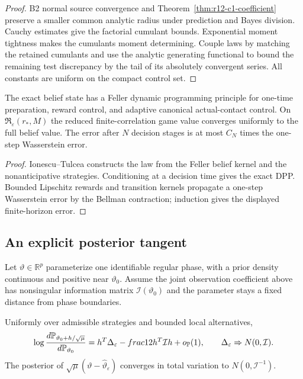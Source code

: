 \begin{proof}
B2 normal source convergence and Theorem~\ref{thm:r12-c1-coefficient} preserve
a smaller common analytic radius under prediction and Bayes division.
Cauchy estimates give the factorial cumulant bounds.  Exponential moment
tightness makes the cumulants moment determining.  Couple laws by matching the
retained cumulants and use the analytic generating functional to bound the
remaining test discrepancy by the tail of its absolutely convergent series.
All constants are uniform on the compact control set.
\end{proof}

\begin{theorem}
\label{thm:r12-c1-dpp}
The exact belief state has a Feller dynamic programming principle for one-time
preparation, reward control, and adaptive canonical actual-contact control.
On $\mathfrak R_\varepsilon(r_*,M)$ the reduced finite-correlation game value
converges uniformly to the full belief value.  The error after $N$ decision
stages is at most $C_N$ times the one-step Wasserstein error.
\end{theorem}

\begin{proof}
Ionescu--Tulcea constructs the law from the Feller belief kernel and the
nonanticipative strategies.  Conditioning at a decision time gives the exact
DPP.  Bounded Lipschitz rewards and transition kernels propagate a one-step
Wasserstein error by the Bellman contraction; induction gives the displayed
finite-horizon error.
\end{proof}

\subsection{An explicit posterior tangent}

Let $\vartheta\in\mathbb R^p$ parameterize one identifiable regular phase,
with a prior density continuous and positive near $\vartheta_0$.  Assume the
joint observation coefficient above has nonsingular information matrix
$\mathcal I(\vartheta_0)$ and the parameter stays a fixed distance from phase
boundaries.

\begin{theorem}
\label{thm:r12-c1-bvm}
Uniformly over admissible strategies and bounded local alternatives,
\[
 \log{d\mathbb P_{\vartheta_0+h/\sqrt\mu}\over
          d\mathbb P_{\vartheta_0}}
 =h^T\Delta_\varepsilon-	frac12h^T\mathcal Ih+o_{\mathbb P}(1),
 \qquad
 \Delta_\varepsilon\Rightarrow N(0,\mathcal I).
\]
The posterior of $\sqrt\mu(\vartheta-\widehat\vartheta_\varepsilon)$ converges
in total variation to $N(0,\mathcal I^{-1})$.
\end{theorem}

